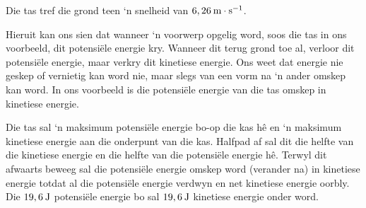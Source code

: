 Die tas tref die grond teen ‘n snelheid van $6,26\phantom{\rule{2pt}{0ex}}\text{m}\ensuremath{\cdot}\text{s}{}^{-1}$.\par 
Hieruit kan ons sien dat wanneer ‘n voorwerp opgelig word, soos die tas in ons voorbeeld, dit potensiële energie kry. Wanneer dit terug grond toe al, verloor dit potensiële energie, maar verkry dit kinetiese energie. Ons weet dat energie nie geskep of vernietig kan word nie, maar slegs van een vorm na ‘n ander omskep kan word. In ons voorbeeld is die potensiële energie van die tas omskep in kinetiese energie.\par 
Die tas sal ‘n maksimum potensiële energie bo-op die kas hê en ‘n maksimum kinetiese energie aan die onderpunt van die kas. Halfpad af sal dit die helfte van die kinetiese energie en die helfte van die potensiële energie hê. Terwyl dit afwaarts beweeg sal die potensiële energie omskep word (verander na) in kinetiese energie totdat al die potensiële energie verdwyn en net kinetiese energie oorbly. Die $19,6\phantom{\rule{2pt}{0ex}}\text{J}$ potensiële energie bo sal $19,6\phantom{\rule{2pt}{0ex}}\text{J}$ kinetiese energie onder word.\par 

